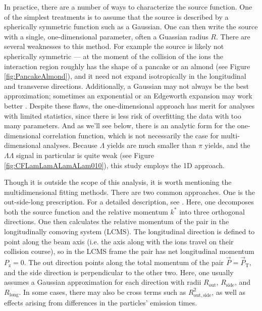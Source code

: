 In practice, there are a number of ways to characterize the source function.
One of the simplest treatments is to assume that the source is described by a spherically symmetric function such as a Gaussian.
One can then write the source with a single, one-dimensional parameter, often a Guassian radius $R$.
There are several weaknesses to this method.
For example the source is likely not spherically symmetric --- at the moment of the collision of the ions the interaction region roughly has the shape of a pancake or an almond (see Figure \ref{fig:PancakeAlmond}), and it need not expand isotropically in the longitudinal and transverse directions.
Additionally, a Gaussian may not always be the best approximation; sometimes an exponential or an Edgeworth expansion may work better \cite{Abelev:2014pja}.
Despite these flaws, the one-dimensional approach has merit for analyses with limited statistics, since there is less risk of overfitting the data with too many parameters.
And as we'll see below, there is an analytic form for the one-dimensional correlation function, which is not necessarily the case for multi-dimensional analyses.
Because $\Lambda$ yields are much smaller than $\pi$ yields, and the $\Lambda\Lambda$ signal in particular is quite weak (see Figure \ref{fig:CFLamLamALamALam010}), this study employs the 1D approach.

Though it is outside the scope of this analysis, it is worth mentioning the multidimensional fitting methods.
There are two common approaches.
One is the out-side-long prescription.
For a detailed description, see \cite{Lisa:2005dd}.
Here, one decomposes both the source function and the relative momentum $k^*$ into three orthogonal directions.
One then calculates the relative momentum of the pair in the longitudinally comoving system (LCMS).
The longitudinal direction is defined to point along the beam axis (i.e. the axis along with the ions travel on their collision course), so in the LCMS frame the pair has net longitudinal momentum $P_\mathrm{z} = 0$.
The out direction points along the total momentum of the pair $\vec{P}=\vec{P}_{\mathrm{T}}$, and the side direction is perpendicular to the other two.
Here, one usually assumes a Gaussian approximation for each direction with radii $R_\mathrm{out}$, $R_\mathrm{side}$, and $R_\mathrm{long}$.
In some cases, there may also be cross terms such as $R^2_{\mathrm{out,side}}$, as well as effects arising from differences in the particles' emission times.

